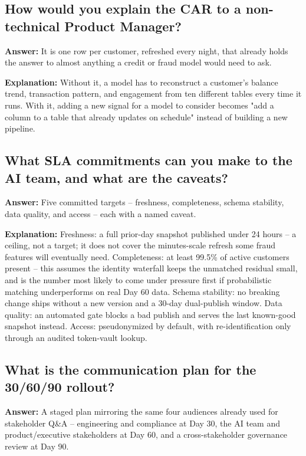 \documentclass[11pt]{article}
\begin{document}
\subsection{How would you explain the CAR to a non-technical Product Manager?}
\textbf{Answer:} It is one row per customer, refreshed every night, that already holds the answer to almost anything a credit or fraud model would need to ask.

\textbf{Explanation:} Without it, a model has to reconstruct a customer's balance trend, transaction pattern, and engagement from ten different tables every time it runs. With it, adding a new signal for a model to consider becomes "add a column to a table that already updates on schedule" instead of building a new pipeline.

\subsection{What SLA commitments can you make to the AI team, and what are the caveats?}
\textbf{Answer:} Five committed targets -- freshness, completeness, schema stability, data quality, and access -- each with a named caveat.

\textbf{Explanation:} Freshness: a full prior-day snapshot published under 24 hours -- a ceiling, not a target; it does not cover the minutes-scale refresh some fraud features will eventually need. Completeness: at least 99.5\% of active customers present -- this assumes the identity waterfall keeps the unmatched residual small, and is the number most likely to come under pressure first if probabilistic matching underperforms on real Day 60 data. Schema stability: no breaking change ships without a new version and a 30-day dual-publish window. Data quality: an automated gate blocks a bad publish and serves the last known-good snapshot instead. Access: pseudonymized by default, with re-identification only through an audited token-vault lookup.

\subsection{What is the communication plan for the 30/60/90 rollout?}
\textbf{Answer:} A staged plan mirroring the same four audiences already used for stakeholder Q\&A -- engineering and compliance at Day 30, the AI team and product/executive stakeholders at Day 60, and a cross-stakeholder governance review at Day 90.
\end{document}
